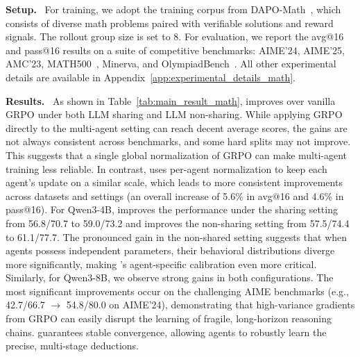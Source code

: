 \textbf{Setup.}~
For training, we adopt the training corpus from DAPO-Math~\citep{yu2025dapo}, which consists of diverse math problems paired with verifiable solutions and reward signals. The rollout group size is set to 8. For evaluation, we report the avg@16 and pass@16 results on a suite of competitive benchmarks: AIME'24, AIME'25, AMC'23, MATH500~\citep{hendrycks2021measuring}, Minerva, and OlympiadBench~\citep{he2024olympiadbench}. All other experimental details are available in Appendix~\ref{app:experimental_details_math}.

\textbf{Results.}~
As shown in Table~\ref{tab:main_result_math}, \methodname{} improves over vanilla GRPO under both LLM sharing and LLM non-sharing. While applying GRPO directly to the multi-agent setting can reach decent average scores, the gains are not always consistent across benchmarks, and some hard splits may not improve. This suggests that a single global normalization of GRPO can make multi-agent training less reliable. In contrast, \methodname{} uses per-agent normalization to keep each agent’s update on a similar scale, which leads to more consistent improvements across datasets and settings (an overall increase of 5.6\% in avg@16 and 4.6\% in pass@16). For Qwen3-4B, \methodname{} improves the performance under the sharing setting from 56.8/70.7 to 59.0/73.2 and improves the non-sharing setting from 57.5/74.4 to 61.1/77.7. The pronounced gain in the non-shared setting suggests that when agents possess independent parameters, their behavioral distributions diverge more significantly, making \methodname{}'s agent-specific calibration even more critical. Similarly, for Qwen3-8B, we observe strong gains in both configurations. The most significant improvements occur on the challenging AIME benchmarks (e.g., 42.7/66.7 $\rightarrow$ 54.8/80.0 on AIME’24), demonstrating that high-variance gradients from GRPO can easily disrupt the learning of fragile, long-horizon reasoning chains. \methodname{} guarantees stable convergence, allowing agents to robustly learn the precise, multi-stage deductions.

